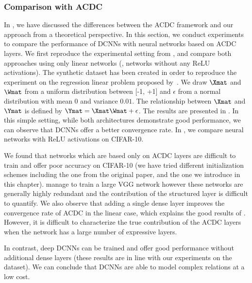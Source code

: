 \subsubsection{Comparison with ACDC}

In , we have discussed the differences between the ACDC framework and our approach from a theoretical perspective.
In this section, we conduct experiments to compare the performance of DCNNs with neural networks based on ACDC layers. 
We first reproduce the experimental setting from \citet{moczulski2016acdc}, and compare both approaches using only linear networks (\ie, networks without any ReLU activations).
The synthetic dataset has been created in order to reproduce the experiment on the regression linear problem proposed by~\citet{moczulski2016acdc}.
We draw $\Xmat$ and $\Wmat$ from a uniform distribution between [-1, +1] and $\epsilon$ from a normal distribution with mean 0 and variance $0.01$.
The relationship between $\Xmat$ and $\Ymat$ is defined by $\Ymat = \Xmat\Wmat + \epsilon$. 
The results are presented in .
In this simple setting, while both architectures demonstrate good performance, we can observe that DCNNs offer a better convergence rate.
In , we compare neural networks with ReLU activations on CIFAR-10. 

We found that networks which are based only on ACDC layers are difficult to train and offer poor accuracy on CIFAR-10 (we have tried different initialization schemes including the one from the original paper, and the one we introduce in this chapter).
\citet{moczulski2016acdc} manage to train a large VGG network  however these networks are generally highly redundant and the contribution of the structured layer is difficult to quantify. 
We also observe that adding a single dense layer improves the convergence rate of ACDC in the linear case, which explains the good results of \citet{moczulski2016acdc}.
However, it is difficult to characterize the true contribution of the ACDC layers when the network has a large number of expressive layers.

In contrast, deep DCNNs can be trained and offer good performance without additional dense layers (these results are in line with our experiments on the \yt dataset).
We can conclude that DCNNs are able to model complex relations at a low cost. 

